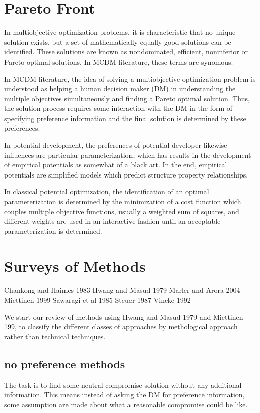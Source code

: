 \section{Pareto Front}

In multiobjective optimization problems, it is characteristic that no unique solution exists, but a set of mathematically equally good solutions can be identified.  These solutions are known as nondominated, efficient, noninferior or Pareto optimal solutions.  In MCDM literature, these terms are synomous.

In MCDM literature, the idea of solving a multiobjective optimization problem is understood as helping a human decision maker (DM) in understanding the multiple objectives simultaneously and finding a Pareto optimal solution.  Thus, the solution process requires some interaction with the DM in the form of specifying preference information and the final solution is determined by these preferences.

In potential development, the preferences of potential developer likewise influences are particular parameterization, which has results in the development of empirical potentials as somewhat of a black art.  In the end, empirical potentials are simplified models which predict structure property relationships.

In classical potential optimization, the identification of an optimal parameterization is determined by the minimization of a cost function which couples multiple objective functions, usually a weighted sum of squares, and different weights are used in an interactive fashion until an acceptable parameterization is determined.
\section{Surveys of Methods}
Chankong and Haimes 1983
Hwang and Masud 1979
Marler and Arora 2004
Miettinen 1999
Sawaragi et al 1985
Steuer 1987
Vincke 1992

We start our review of methods using Hwang and Masud 1979 and Miettinen 199, to classify the different classes of approaches by methological approach rather than technical techniques.
\subsection{no preference methods}
The task is to find some neutral compromise solution without any additional information.  This means instead of asking the DM for preference information, some assumption are made about what a reasonable compromise could be like.
